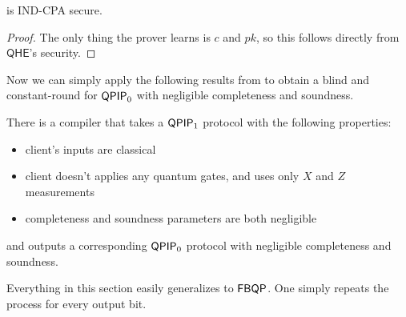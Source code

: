 \begin{thm}
	 is IND-CPA secure.
\end{thm}
\begin{proof}
	The only thing the prover learns is $c$ and $pk$, so this follows directly from $\mathsf{QHE}$'s security.
\end{proof}

Now we can simply apply the following results from \cite{parallelrep} to obtain a blind and constant-round for $\operatorname{\mathsf{QPIP}}_0$ with negligible completeness and soundness.
\begin{thm}
	There is a compiler that takes a $\operatorname{\mathsf{QPIP}}_1$ protocol with the following properties:
	\begin{itemize}
		\item client's inputs are classical
		\item client doesn't applies any quantum gates, and uses only $X$ and $Z$ measurements
		\item completeness and soundness parameters are both negligible
	\end{itemize}
	and outputs a corresponding $\operatorname{\mathsf{QPIP}}_0$ protocol with negligible completeness and soundness.
\end{thm}

\begin{rmk}
	Everything in this section easily generalizes to $\operatorname{\mathsf{FBQP}}$. One simply repeats the process for every output bit.
\end{rmk}
